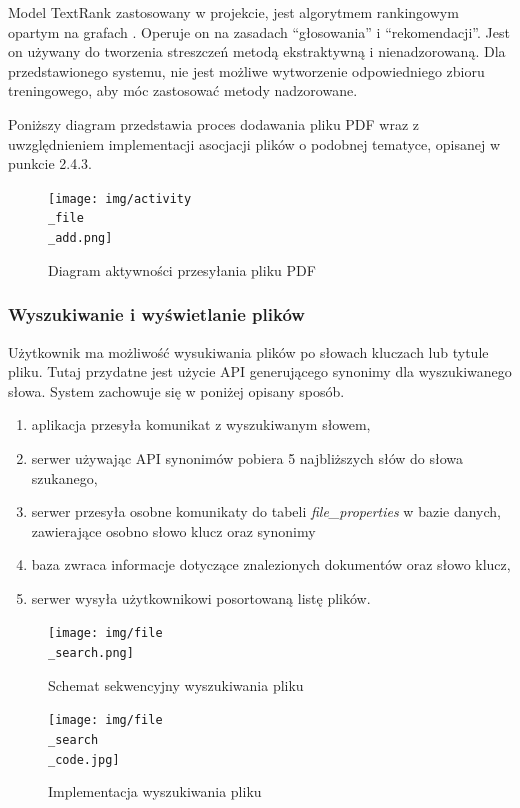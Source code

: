 \documentclass[12pt,a4paper,twoside]{article}
\begin{document}
Model TextRank zastosowany w projekcie, jest algorytmem rankingowym opartym na grafach \cite{textrank}. Operuje on na zasadach ``głosowania'' i ``rekomendacji''. Jest on używany do tworzenia streszczeń metodą ekstraktywną i nienadzorowaną. Dla przedstawionego systemu, nie jest możliwe wytworzenie odpowiedniego zbioru treningowego, aby móc zastosować metody nadzorowane. \par
Poniższy diagram przedstawia proces dodawania pliku PDF wraz z uwzględnieniem implementacji asocjacji plików o podobnej tematyce, opisanej w punkcie 2.4.3.
\begin{figure}[h!]
\centering
  \texttt{[image: img/activity\\\_file\\\_add.png]}
  \caption{Diagram aktywności przesyłania pliku PDF}
\end{figure}
\subsubsection{Wyszukiwanie i wyświetlanie plików}
Użytkownik ma możliwość wysukiwania plików po słowach kluczach lub tytule pliku. Tutaj przydatne jest użycie API generującego synonimy dla wyszukiwanego słowa. System zachowuje się w poniżej opisany sposób.
\begin{enumerate}
	\item aplikacja przesyła komunikat z wyszukiwanym słowem,
	\item serwer używając API synonimów pobiera 5 najbliższych słów do słowa szukanego,
	\item serwer przesyła osobne komunikaty do tabeli \textit{file\_properties} w bazie danych, zawierające osobno słowo klucz oraz synonimy
	\item baza zwraca informacje dotyczące znalezionych dokumentów oraz słowo klucz,
	\item serwer wysyła użytkownikowi posortowaną listę plików.
\end{enumerate}
\begin{figure}[h!]
\centering
  \texttt{[image: img/file\\\_search.png]}
  \caption{Schemat sekwencyjny wyszukiwania pliku}
\end{figure}
\begin{figure}[h!]
\centering
  \texttt{[image: img/file\\\_search\\\_code.jpg]}
  \caption{Implementacja wyszukiwania pliku}
\end{figure}
\newpage
\end{document}
